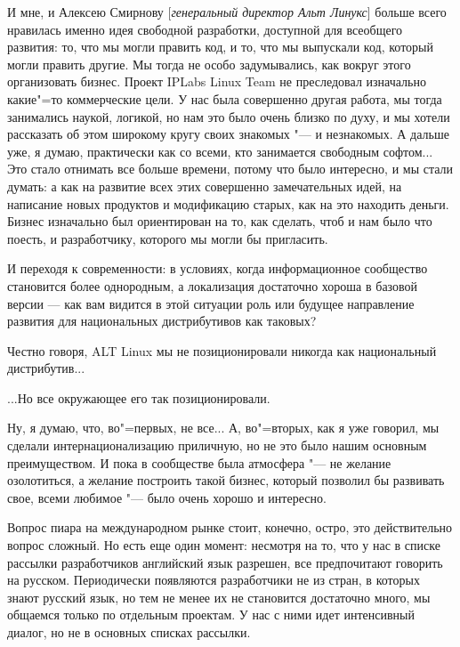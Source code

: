 \documentclass[10pt, a5paper]{article}
\begin{document}
И мне, и Алексею Смирнову [\emph{генеральный директор Альт Линукс}]  больше всего нравилась именно идея свободной разработки, доступной для всеобщего развития: то, что мы могли править код, и то, что мы выпускали код, который могли править другие. Мы тогда не особо задумывались, как вокруг этого организовать бизнес. Проект  IPLabs Linux Team не преследовал изначально какие"=то коммерческие цели. У нас была  совершенно другая работа, мы тогда занимались наукой, логикой, но нам это было очень близко по духу, и мы хотели рассказать об этом широкому кругу своих знакомых "--- и незнакомых. А дальше уже, я думаю, практически как со всеми, кто занимается свободным софтом... Это стало отнимать все больше времени, потому что было интересно, и мы стали думать: а как на развитие всех этих совершенно замечательных идей, на написание новых продуктов и модификацию старых, как на это находить деньги. Бизнес изначально был ориентирован на то, как сделать, чтоб и нам было что поесть, и разработчику, которого мы могли бы пригласить. 

\q И переходя к современности: в условиях, когда информационное сообщество становится более однородным, а локализация  достаточно хороша в базовой версии — как вам видится в этой ситуации роль или будущее направление развития для национальных дистрибутивов как таковых?

\a Честно говоря, ALT Linux мы не позиционировали никогда как национальный дистрибутив...
 
\q ...Но все окружающее его так позиционировали.

\a Ну, я думаю, что, во"=первых, не все... А, во"=вторых, как я уже говорил, мы сделали интернационализацию приличную, но не это было нашим основным преимуществом. И пока в сообществе была атмосфера "--- не желание озолотиться, а желание построить такой бизнес, который позволил бы развивать свое, всеми любимое "--- было очень хорошо и интересно.

Вопрос пиара на международном рынке стоит, конечно, остро, это действительно вопрос сложный. Но есть еще один момент: несмотря на то, что у нас в списке рассылки разработчиков английский язык разрешен, все предпочитают говорить на русском. Периодически появляются разработчики не из стран, в которых знают русский язык, но тем не менее их не становится достаточно много, мы общаемся только по отдельным проектам. У нас с ними идет интенсивный диалог, но не в основных списках рассылки. 
\end{document}
